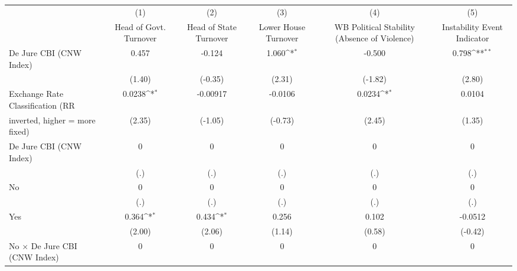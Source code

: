 {
\def\sym#1{\ifmmode^{#1}\else\(^{#1}\)\fi}
\begin{tabular}{l*{5}{c}}
\toprule
                                        &\multicolumn{1}{c}{(1)}&\multicolumn{1}{c}{(2)}&\multicolumn{1}{c}{(3)}&\multicolumn{1}{c}{(4)}&\multicolumn{1}{c}{(5)}\\
                                        &\multicolumn{1}{c}{Head of Govt. Turnover}&\multicolumn{1}{c}{Head of State Turnover}&\multicolumn{1}{c}{Lower House Turnover}&\multicolumn{1}{c}{WB Political Stability (Absence of Violence)}&\multicolumn{1}{c}{Instability Event Indicator}\\
\midrule
De Jure CBI (CNW Index)                 &    0.457         &   -0.124         &    1.060\sym{*}  &   -0.500         &    0.798\sym{**} \\
                                        &   (1.40)         &  (-0.35)         &   (2.31)         &  (-1.82)         &   (2.80)         \\
\addlinespace
Exchange Rate Classification (RR        &   0.0238\sym{*}  & -0.00917         &  -0.0106         &   0.0234\sym{*}  &   0.0104         \\
inverted, higher = more fixed)          &   (2.35)         &  (-1.05)         &  (-0.73)         &   (2.45)         &   (1.35)         \\
\addlinespace
De Jure CBI (CNW Index)                 &        0         &        0         &        0         &        0         &        0         \\
                                        &      (.)         &      (.)         &      (.)         &      (.)         &      (.)         \\
\addlinespace
No                                      &        0         &        0         &        0         &        0         &        0         \\
                                        &      (.)         &      (.)         &      (.)         &      (.)         &      (.)         \\
\addlinespace
Yes                                     &    0.364\sym{*}  &    0.434\sym{*}  &    0.256         &    0.102         &  -0.0512         \\
                                        &   (2.00)         &   (2.06)         &   (1.14)         &   (0.58)         &  (-0.42)         \\
\addlinespace
No $\times$ De Jure CBI (CNW Index)     &        0         &        0         &        0         &        0         &        0         \\

\end{tabular}}
